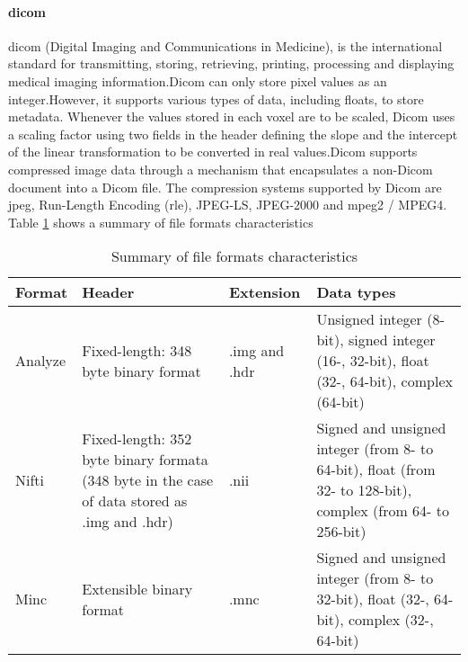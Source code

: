 \paragraph{\ac{dicom}}
\ac{dicom} (Digital Imaging and Communications in Medicine), is the international standard for transmitting, storing, retrieving, printing, processing and displaying medical imaging information.Dicom can only store pixel values ​​as an integer.However, it supports various types of data, including floats, to store metadata. Whenever the values ​​stored in each voxel are to be scaled, Dicom uses a scaling factor using two fields in the header defining the slope and the intercept of the linear transformation to be converted in real values.Dicom supports compressed image data through a mechanism that encapsulates a non-Dicom document into a Dicom file. The compression systems supported by Dicom are \ac{jpeg}, Run-Length Encoding (\ac{rle}), JPEG-LS, JPEG-2000 and \ac{mpeg}2 / MPEG4.\cite{DIC:1,ME:1}\\
Table \ref{me-file-format} shows a summary of file formats characteristics
\begin{table}[h]
\begin{center}
\begin{tabular}{l p{5cm} l p{5cm}}
\hline
\textbf{Format} & \textbf{Header}                                                                              & \textbf{Extension} & \textbf{Data types}                                                                                     \\ \hline
Analyze & Fixed-length: 348 byte binary format                                                         & .img and .hdr & Unsigned integer (8-bit), signed integer (16-, 32-bit), float (32-, 64-bit), complex (64-bit)               \\ \hline
Nifti   & Fixed-length: 352 byte binary formata (348 byte in the case of data stored as .img and .hdr) & .nii          & Signed and unsigned integer (from 8- to 64-bit), float (from 32- to 128-bit), complex (from 64- to 256-bit) \\ \hline
Minc    & Extensible binary format                                                                     & .mnc          & Signed and unsigned integer (from 8- to 32-bit), float (32-, 64-bit), complex (32-, 64-bit)            
\end{tabular}
\caption{Summary of file formats characteristics \cite{ME:1}}
\label{me-file-format}
\end{center}
\end{table}